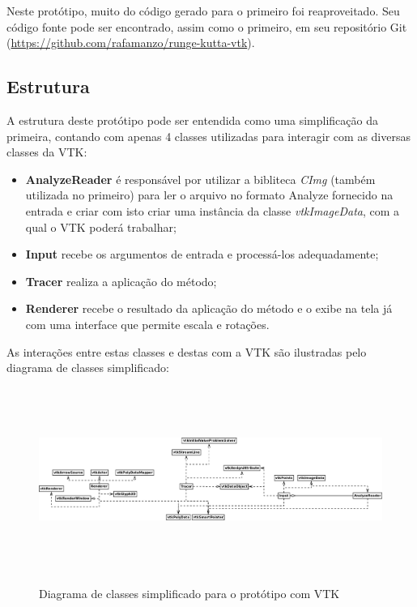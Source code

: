   Neste protótipo, muito do código gerado para o primeiro foi reaproveitado. Seu código fonte pode ser encontrado, assim como o primeiro, em seu repositório Git (\href{https://github.com/rafamanzo/runge-kutta-vtk}{https://github.com/rafamanzo/runge-kutta-vtk}).
  
  \subsection{Estrutura}
  A estrutura deste protótipo pode ser entendida como uma simplificação da primeira, contando com apenas 4 classes utilizadas para interagir com as diversas classes da VTK:
  \begin{itemize}
    \item \textbf{AnalyzeReader} é responsável por utilizar a bibliteca \textit{CImg} (também utilizada no primeiro) para ler o arquivo no formato Analyze fornecido na entrada e criar com isto criar uma instância da classe \textit{vtkImageData}, com a qual o VTK poderá trabalhar;
    \item \textbf{Input} recebe os argumentos de entrada e processá-los adequadamente;
    \item \textbf{Tracer} realiza a aplicação do método;
    \item \textbf{Renderer} recebe o resultado da aplicação do método e o exibe na tela já com uma interface que permite escala e rotações.
  \end{itemize}

  As interações entre estas classes e destas com a VTK são ilustradas pelo diagrama de classes simplificado:
  
  \begin{figure}[!h]
    \begin{center}
      \includegraphics[width=125mm, height=60mm]{images/diagramadeclassevtk.png}
      \label{fig:diagramadeclassevtk}
      \caption{Diagrama de classes simplificado para o protótipo com VTK}
    \end{center}
  \end{figure}
  
